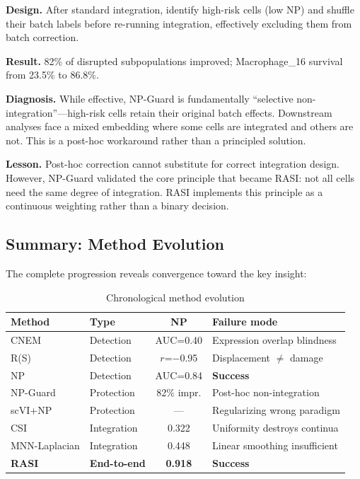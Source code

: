 \documentclass[10pt]{article}
\begin{document}
\textbf{Design.} After standard integration, identify high-risk cells (low NP) and shuffle their batch labels before re-running integration, effectively excluding them from batch correction.

\textbf{Result.} 82\% of disrupted subpopulations improved; Macrophage\_16 survival from 23.5\% to 86.8\%.

\textbf{Diagnosis.} While effective, NP-Guard is fundamentally ``selective non-integration''---high-risk cells retain their original batch effects. Downstream analyses face a mixed embedding where some cells are integrated and others are not. This is a post-hoc workaround rather than a principled solution.

\textbf{Lesson.} Post-hoc correction cannot substitute for correct integration design. However, NP-Guard validated the core principle that became RASI: not all cells need the same degree of integration. RASI implements this principle as a continuous weighting rather than a binary decision.

\subsection{Summary: Method Evolution}

The complete progression reveals convergence toward the key insight:

\begin{table}[h]
\centering
\caption{Chronological method evolution}
\begin{tabular}{llcl}
\toprule
Method & Type & NP & Failure mode \\
\midrule
CNEM & Detection & AUC=0.40 & Expression overlap blindness \\
R(S) & Detection & $r$=$-$0.95 & Displacement $\neq$ damage \\
NP & Detection & AUC=0.84 & \textbf{Success} \\
NP-Guard & Protection & 82\% impr. & Post-hoc non-integration \\
scVI+NP & Protection & --- & Regularizing wrong paradigm \\
CSI & Integration & 0.322 & Uniformity destroys continua \\
MNN-Laplacian & Integration & 0.448 & Linear smoothing insufficient \\
\textbf{RASI} & \textbf{End-to-end} & \textbf{0.918} & \textbf{Success} \\
\bottomrule
\end{tabular}
\end{table}
\end{document}
